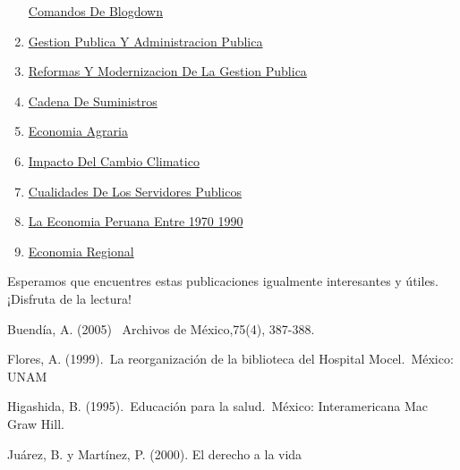 \documentclass[
  jou,
  floatsintext,
  longtable,
  a4paper,
  nolmodern,
  notxfonts,
  notimes,
  colorlinks=true,linkcolor=blue,citecolor=blue,urlcolor=blue]{apa7}
\begin{document}
\begin{enumerate}
  \href{https://achalmaedison.netlify.app/blog/posts/2021-07-14-comandos-de-blogdown}{Comandos
  De Blogdown}
\item
  \href{https://achalmaedison.netlify.app/blog/posts/2021-10-01-gestion-publica-y-administracion-publica/index.pdf}{}
  \href{https://achalmaedison.netlify.app/blog/posts/2021-10-01-gestion-publica-y-administracion-publica}{Gestion
  Publica Y Administracion Publica}
\item
  \href{https://achalmaedison.netlify.app/blog/posts/2021-10-01-reformas-y-modernizacion-de-la-gestion-publica/index.pdf}{}
  \href{https://achalmaedison.netlify.app/blog/posts/2021-10-01-reformas-y-modernizacion-de-la-gestion-publica}{Reformas
  Y Modernizacion De La Gestion Publica}
\item
  \href{https://achalmaedison.netlify.app/blog/posts/2022-01-23-cadena\%20de\%20suministros/index.pdf}{}
  \href{https://achalmaedison.netlify.app/blog/posts/2022-01-23-cadena\%20de\%20suministros}{Cadena
  De Suministros}
\item
  \href{https://achalmaedison.netlify.app/blog/posts/2022-04-22-economia-agraria/index.pdf}{}
  \href{https://achalmaedison.netlify.app/blog/posts/2022-04-22-economia-agraria}{Economia
  Agraria}
\item
  \href{https://achalmaedison.netlify.app/blog/posts/2022-06-02-impacto-del-cambio-climatico/index.pdf}{}
  \href{https://achalmaedison.netlify.app/blog/posts/2022-06-02-impacto-del-cambio-climatico}{Impacto
  Del Cambio Climatico}
\item
  \href{https://achalmaedison.netlify.app/blog/posts/2023-05-11-cualidades-de-los-servidores-publicos/index.pdf}{}
  \href{https://achalmaedison.netlify.app/blog/posts/2023-05-11-cualidades-de-los-servidores-publicos}{Cualidades
  De Los Servidores Publicos}
\item
  \href{https://achalmaedison.netlify.app/blog/posts/2023-05-12-la-economia-peruana-entre-1970-1990/index.pdf}{}
  \href{https://achalmaedison.netlify.app/blog/posts/2023-05-12-la-economia-peruana-entre-1970-1990}{La
  Economia Peruana Entre 1970 1990}
\item
  \href{https://achalmaedison.netlify.app/blog/posts/2023-05-16-economia-regional/index.pdf}{}
  \href{https://achalmaedison.netlify.app/blog/posts/2023-05-16-economia-regional}{Economia
  Regional}
\end{enumerate}

Esperamos que encuentres estas publicaciones igualmente interesantes y
útiles. ¡Disfruta de la lectura!

Buendía, A. (2005) ~Archivos de México,75(4), 387-388.

Flores, A. (1999).~La reorganización de la biblioteca del Hospital
Mocel.~México: UNAM

Higashida, B. (1995).~Educación para la salud.~México: Interamericana
Mac Graw Hill.

Juárez, B. y Martínez, P. (2000). El derecho a la vida
\end{document}
